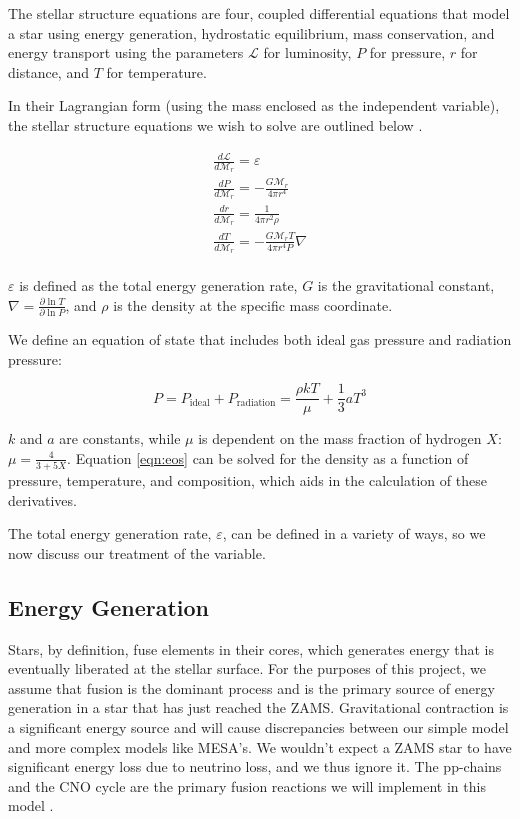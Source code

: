 \documentclass[twocolumn]{aastex631}
\begin{document}
The stellar structure equations are four, coupled differential equations that model a star using energy generation, hydrostatic equilibrium, mass conservation, and energy transport using the parameters $\mathcal{L}$ for luminosity, $P$ for pressure, $r$ for distance, and $T$ for temperature.

In their Lagrangian form (using the mass enclosed as the independent variable), the stellar structure equations we wish to solve are outlined below \citep{stelstrucev}.

\begin{equation}
\boxed{
\begin{array}{lcl}
\frac{d\mathcal{L}}{d\mathcal{M}_r} = \varepsilon \\
\frac{d P}{d\mathcal{M}_r} = - \frac{G\mathcal{M}_r}{4\pi r^4} \\
\frac{d r}{d\mathcal{M}_r} = \frac{1}{4\pi r^2\rho} \\
\frac{d T}{d\mathcal{M}_r} = -\frac{G\mathcal{M}_r T}{4\pi r^4 P}\nabla \\
\end{array}
}
\end{equation}

$\varepsilon$ is defined as the total energy generation rate, $G$ is the gravitational constant, $\nabla = \frac{\partial \ln{T}}{\partial \ln{P}}$, and $\rho$ is the density at the specific mass coordinate.

We define an equation of state that includes both ideal gas pressure and radiation pressure:

\begin{equation}
	\label{eqn:eos}
	P = P_\text{ideal} + P_\text{radiation} = \frac{\rho k T}{\mu} + \frac{1}{3}aT^3
\end{equation}

$k$ and $a$ are constants, while $\mu$ is dependent on the mass fraction of hydrogen $X$: $\mu = \frac{4}{3 + 5X}$. Equation \ref{eqn:eos} can be solved for the density as a function of pressure, temperature, and composition, which aids in the calculation of these derivatives. 

The total energy generation rate, $\varepsilon$, can be defined in a variety of ways, so we now discuss our treatment of the variable.

\subsection{Energy Generation}

Stars, by definition, fuse elements in their cores, which generates energy that is eventually liberated at the stellar surface. For the purposes of this project, we assume that fusion is the dominant process and is the primary source of energy generation in a star that has just reached the ZAMS. Gravitational contraction is a significant energy source and will cause discrepancies between our simple model and more complex models like MESA's. We wouldn't expect a ZAMS star to have significant energy loss due to neutrino loss, and we thus ignore it. The pp-chains and the CNO cycle are the primary fusion reactions we will implement in this model \citep{stelstrucev}. 
\end{document}
